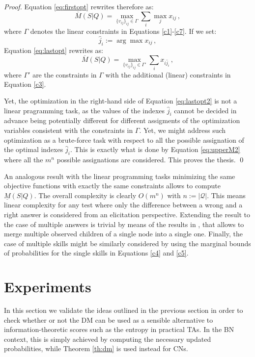 \documentclass[runningheads]{llncs}
\begin{document}
\begin{theorem}
\begin{proof}
Equation \eqref{eq:firstopt} rewrites therefore as:
\begin{equation}\label{eq:lastopt}
\overline{M}(S|Q)
=\max_{ \{v_{ij}\}_{ij} \in \Gamma} \sum_{i} \max_{j} x_{ij} \,,
\end{equation}
where $\Gamma$ denotes the linear constraints in Equations \eqref{c1}-\eqref{c7}. If we set:
\begin{equation}
\hat{j}_i:= \arg \max x_{ij}\,,
\end{equation}
Equation \eqref{eq:lastopt} rewrites as:
\begin{equation}\label{eq:lastopt2}
\overline{M}(S|Q)
=\max_{ \{v_{ij}\}_{ij} \in \Gamma'} \sum_{i} x_{i\hat{j}_i} \,,
\end{equation}
where $\Gamma'$ are the constraints in $\Gamma$ with the additional (linear) constraints in Equation \eqref{c3}.

Yet, the optimization in the right-hand side of Equation \eqref{eq:lastopt2} is not a linear pragramming task, as the values of the indexes $\hat{j}_i$ cannot be decided in advance being potentially different for different assigments of the optimization variables consistent with the constraints in $\Gamma$. Yet, we might address such optimization as a brute-force task with respect to all the possible assignation of the optimal indexes $\hat{j}_i$. This is exactly what is done by Equation \eqref{eq:upperM2} where all the $m^n$ possible assignations are considered. This proves the thesis. \qed
\end{proof}
\end{theorem}

An analogous result with the linear programming tasks minimizing the same objective functions with exactly the same constraints allows to compute $\underline{M}(S|Q)$. 
The overall complexity is clearly $O(m^n)$ with $n:=|\mathcal{Q}|$. This means linear complexity for any test where only the difference between a wrong and a right answer is considered from an elicitation perspective. Extending the result to the case of multiple answers is trivial by means of the results in \cite{antonucci2009}, that allows to merge multiple observed children of a single node into a single one.
Finally, the case of multiple skills might be similarly considered by using the marginal bounds of probabilities for the single skills in Equations \eqref{c4} and \eqref{c5}. 


\section{Experiments}\label{sec:exp}
In this section we validate the ideas outlined in the previous section in order to check whether or not the DM can be used as a sensible alternative to information-theoretic scores such as the entropy in practical TAs. In the BN context, this is simply achieved by computing the necessary updated probabilities, while Theorem \ref{th:dm} is used instead for CNs.
\end{document}
